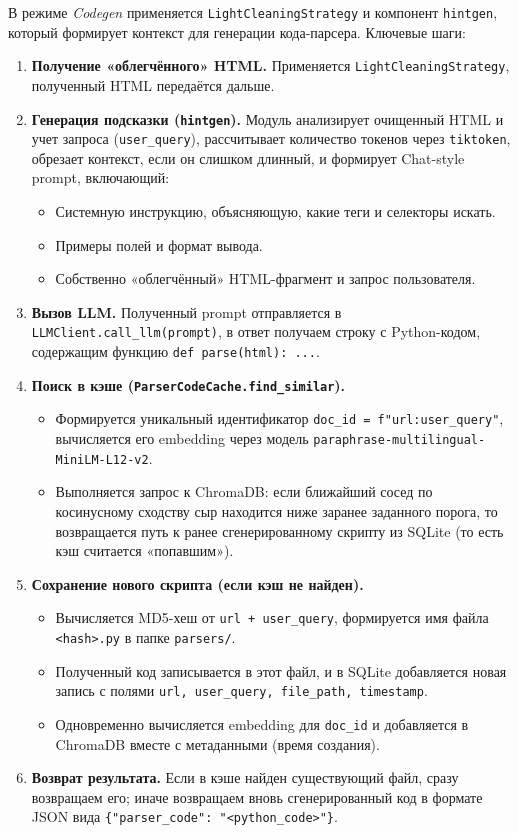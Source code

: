 В режиме \emph{Codegen} применяется \texttt{LightCleaningStrategy} и компонент \texttt{hintgen}, который формирует контекст для генерации кода-парсера. Ключевые шаги:
\begin{enumerate}
    \item \textbf{Получение «облегчённого» HTML.} Применяется \texttt{LightCleaningStrategy}, полученный HTML передаётся дальше.
    \item \textbf{Генерация подсказки (\texttt{hintgen}).} Модуль анализирует очищенный HTML и учет запроса (\texttt{user\_query}), рассчитывает количество токенов через \texttt{tiktoken}, обрезает контекст, если он слишком длинный, и формирует Chat-style prompt, включающий:
    \begin{itemize}
        \item Системную инструкцию, объясняющую, какие теги и селекторы искать.
        \item Примеры полей и формат вывода.
        \item Собственно «облегчённый» HTML-фрагмент и запрос пользователя.
    \end{itemize}
    \item \textbf{Вызов LLM.} Полученный prompt отправляется в \texttt{LLMClient.call\_llm(prompt)}, в ответ получаем строку с Python-кодом, содержащим функцию \texttt{def parse(html): ...}.
    \item \textbf{Поиск в кэше (\texttt{ParserCodeCache.find\_similar}).}
    \begin{itemize}
        \item Формируется уникальный идентификатор \texttt{doc\_id = f"{url}:{user\_query}"}, вычисляется его embedding через модель \texttt{paraphrase-multilingual-MiniLM-L12-v2}.
        \item Выполняется запрос к ChromaDB: если ближайший сосед по косинусному сходству сыр находится ниже заранее заданного порога, то возвращается путь к ранее сгенерированному скрипту из SQLite (то есть кэш считается «попавшим»).
    \end{itemize}
    \item \textbf{Сохранение нового скрипта (если кэш не найден).}
    \begin{itemize}
        \item Вычисляется MD5-хеш от \texttt{url + user\_query}, формируется имя файла \texttt{<hash>.py} в папке \texttt{parsers/}.
        \item Полученный код записывается в этот файл, и в SQLite добавляется новая запись с полями \texttt{url, user\_query, file\_path, timestamp}.
        \item Одновременно вычисляется embedding для \texttt{doc\_id} и добавляется в ChromaDB вместе с метаданными (время создания).
    \end{itemize}
    \item \textbf{Возврат результата.} Если в кэше найден существующий файл, сразу возвращаем его; иначе возвращаем вновь сгенерированный код в формате JSON вида \texttt{\{"parser\_code": "<python\_code>"\}}.
\end{enumerate}

